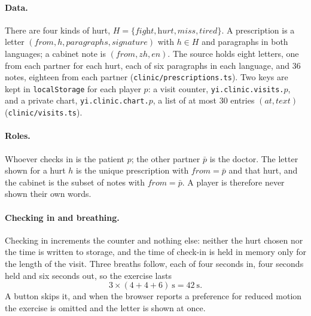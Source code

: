 \documentclass[sigconf,nonacm]{acmart}
\newcommand{\code}[1]{\textnormal{\texttt{\small #1}}}
\begin{document}
\paragraph{Data.}
There are four kinds of hurt, $H=\{\textit{fight},\textit{hurt},\textit{miss},\textit{tired}\}$.
A prescription is a letter $(\mathit{from}, h, \mathit{paragraphs}, \mathit{signature})$ with
$h\in H$ and paragraphs in both languages; a cabinet note is $(\mathit{from}, \mathit{zh},
\mathit{en})$. The source holds eight letters, one from each partner for each hurt, each of
six paragraphs in each language, and 36 notes, eighteen from each partner
(\code{clinic/prescriptions.ts}). Two keys are kept in \code{localStorage} for each player
$p$: a visit counter, \code{yi.clinic.visits.}$p$, and a private chart,
\code{yi.clinic.chart.}$p$, a list of at most 30 entries $(\mathit{at},\mathit{text})$
(\code{clinic/visits.ts}).

\paragraph{Roles.}
Whoever checks in is the patient $p$; the other partner $\bar p$ is the doctor. The letter shown
for a hurt $h$ is the unique prescription with $\mathit{from}=\bar p$ and that hurt, and the
cabinet is the subset of notes with $\mathit{from}=\bar p$. A player is therefore never shown
their own words.

\paragraph{Checking in and breathing.}
Checking in increments the counter and nothing else: neither the hurt chosen nor the time is
written to storage, and the time of check-in is held in memory only for the length of the
visit. Three breaths follow, each of four seconds in, four seconds held and six seconds out,
so the exercise lasts
\begin{equation}\label{eq:clinicbreath}
  3 \times (4 + 4 + 6)\ \mathrm{s} = 42\ \mathrm{s}.
\end{equation}
A button skips it, and when the browser reports a preference for reduced motion the exercise
is omitted and the letter is shown at once.
\end{document}
